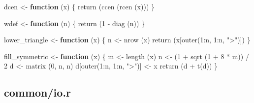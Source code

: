\documentclass[
  12pt,
  letterpaper,
  DIV=11,
  numbers=noendperiod]{scrreprt}
\newenvironment{Shaded}{\begin{snugshade}}{\end{snugshade}}
\newcommand{\ControlFlowTok}[1]{\textcolor[rgb]{0.00,0.23,0.31}{\textbf{#1}}}
\newcommand{\DecValTok}[1]{\textcolor[rgb]{0.68,0.00,0.00}{#1}}
\newcommand{\FunctionTok}[1]{\textcolor[rgb]{0.28,0.35,0.67}{#1}}
\newcommand{\NormalTok}[1]{\textcolor[rgb]{0.00,0.23,0.31}{#1}}
\newcommand{\OtherTok}[1]{\textcolor[rgb]{0.00,0.23,0.31}{#1}}
\newcommand{\SpecialCharTok}[1]{\textcolor[rgb]{0.37,0.37,0.37}{#1}}
\newcommand{\StringTok}[1]{\textcolor[rgb]{0.13,0.47,0.30}{#1}}
\theoremstyle{remark}
\begin{document}
\begin{Shaded}
\begin{Highlighting}[]
\NormalTok{dcen }\OtherTok{\textless{}{-}} \ControlFlowTok{function}\NormalTok{ (x) \{}
  \FunctionTok{return}\NormalTok{ (}\FunctionTok{ccen}\NormalTok{ (}\FunctionTok{rcen}\NormalTok{ (x)))}
\NormalTok{\}}

\NormalTok{wdef }\OtherTok{\textless{}{-}} \ControlFlowTok{function}\NormalTok{ (n) \{}
  \FunctionTok{return}\NormalTok{ (}\DecValTok{1} \SpecialCharTok{{-}} \FunctionTok{diag}\NormalTok{ (n))}
\NormalTok{\}}


\NormalTok{lower\_triangle }\OtherTok{\textless{}{-}} \ControlFlowTok{function}\NormalTok{ (x) \{}
\NormalTok{  n }\OtherTok{\textless{}{-}} \FunctionTok{nrow}\NormalTok{ (x)}
  \FunctionTok{return}\NormalTok{ (x[}\FunctionTok{outer}\NormalTok{(}\DecValTok{1}\SpecialCharTok{:}\NormalTok{n, }\DecValTok{1}\SpecialCharTok{:}\NormalTok{n, }\StringTok{"\textgreater{}"}\NormalTok{)])}
\NormalTok{\}}

\NormalTok{fill\_symmetric }\OtherTok{\textless{}{-}} \ControlFlowTok{function}\NormalTok{ (x) \{}
\NormalTok{  m }\OtherTok{\textless{}{-}} \FunctionTok{length}\NormalTok{ (x)}
\NormalTok{  n }\OtherTok{\textless{}{-}}\NormalTok{ (}\DecValTok{1} \SpecialCharTok{+} \FunctionTok{sqrt}\NormalTok{ (}\DecValTok{1} \SpecialCharTok{+} \DecValTok{8} \SpecialCharTok{*}\NormalTok{ m)) }\SpecialCharTok{/} \DecValTok{2}
\NormalTok{  d }\OtherTok{\textless{}{-}} \FunctionTok{matrix}\NormalTok{ (}\DecValTok{0}\NormalTok{, n, n)}
\NormalTok{  d[}\FunctionTok{outer}\NormalTok{(}\DecValTok{1}\SpecialCharTok{:}\NormalTok{n, }\DecValTok{1}\SpecialCharTok{:}\NormalTok{n, }\StringTok{"\textgreater{}"}\NormalTok{)] }\OtherTok{\textless{}{-}}\NormalTok{ x}
  \FunctionTok{return}\NormalTok{ (d }\SpecialCharTok{+} \FunctionTok{t}\NormalTok{(d))}
\NormalTok{\}}
\end{Highlighting}
\end{Shaded}

\subsection*{common/io.r}\label{apiocode}
\end{document}
